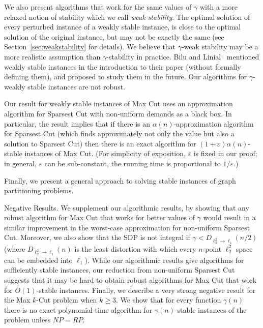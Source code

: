\documentclass[twoside,leqno,twocolumn]{article}
\makeatletter
\def\paragraph{\@startsection  
 {paragraph}{4}{\parindent}{5pt}{-5pt}{\normalsize\bf}}
\makeatother
\begin{document}
We also present algorithms that work for the same values of $\gamma$ with a more relaxed notion of stability 
which we call {\em weak stability}.
The optimal solution of every perturbed instance of a weakly stable instance, is close to the optimal solution
of the original instance, but may not be exactly the same (see Section~\ref{sec:weakstability} for details). We believe that $\gamma$-weak stability may be a more realistic assumption than $\gamma$-stability in practice. Bilu and Linial~\cite{BL} mentioned weakly stable instances in the introduction to their paper (without formally defining them), and proposed to study them in the future.
Our algorithms for $\gamma$-weakly stable instances are not robust.


Our result for weakly stable instances of Max Cut uses an approximation algorithm for Sparsest Cut with non-uniform demands
as a black box. In particular, the result implies that if there is an $\alpha(n)$-approximation algorithm for Sparsest Cut (which finds approximately not only the value but also a solution to Sparsest Cut) 
then there is an exact algorithm for $(1+\varepsilon) \alpha(n)$-stable instances of Max Cut. (For simplicity of exposition,
$\varepsilon$ is fixed in our proof; in general, $\varepsilon$ can be sub-constant, the running time
is proportional to $1/\varepsilon$.)

Finally, we present a general approach to solving stable instances of graph partitioning problems.

\paragraph{Negative Results.} We supplement our algorithmic results, by showing that any robust algorithm for Max Cut that works for better values of $\gamma$ would result in a similar improvement in the worst-case approximation for non-uniform Sparsest Cut. Moreover, we also show that the SDP is not integral if $\gamma < D_{\ell_2^2\to \ell_1}(n/2)$ (where $D_{\ell_2^2\to \ell_1}(n)$ is the least distortion with which every $n$-point $\ell_2^2$ space can be embedded into $\ell_1$). While our algorithmic results give algorithms for sufficiently stable instances, our reduction from non-uniform Sparsest Cut suggests that it may be hard to obtain robust algorithms for Max Cut that work for $O(1)$-stable instances. 
Finally, we describe a very strong negative result for the Max $k$-Cut problem when $k \geq  3$.
We show that for every function $\gamma(n)$ there is no exact polynomial-time algorithm for $\gamma(n)$-stable instances of the problem
unless $NP=RP$.
\end{document}
